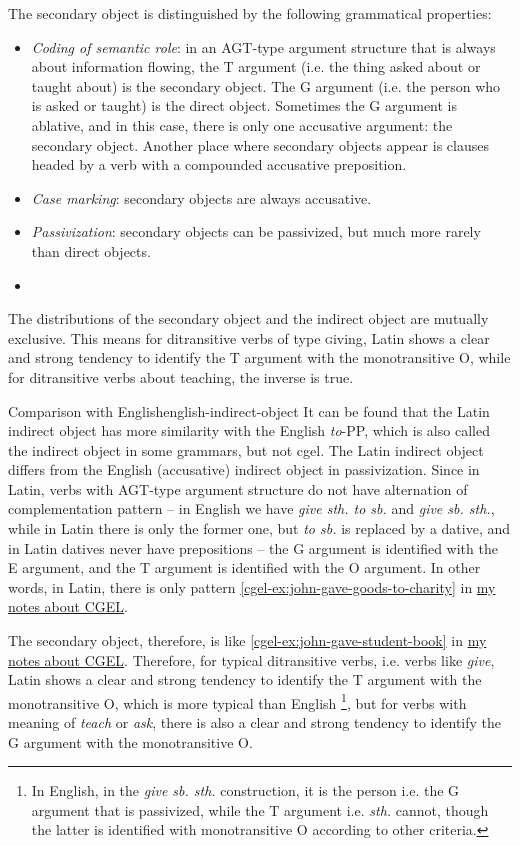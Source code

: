 \documentclass[UTF8, a4paper, oneside]{report}
\newcommand{\corpus}[1]{\emph{#1}}
\newcommand{\cgel}{\href{../English/cambridge.pdf}{my notes about CGEL}}
\newcommand{\classify}[1]{{\textsc #1}}
\begin{document}
The secondary object is distinguished by the following grammatical properties:
\begin{itemize}
    \item \emph{Coding of semantic role}: in an AGT-type argument structure
    that is always about information flowing,
    the T argument (i.e. the thing asked about or taught about) is the secondary object.
    The G argument (i.e. the person who is asked or taught) is the direct object.
    Sometimes the G argument is ablative, and in this case, 
    there is only one accusative argument: the secondary object.
    Another place where secondary objects appear is 
    clauses headed by a verb with a compounded accusative preposition. %
    \item \emph{Case marking}: secondary objects are always accusative.
    \item \emph{Passivization}: secondary objects can be passivized, but much more rarely than direct objects.
    \item %
\end{itemize}

The distributions of the secondary object and the indirect object 
are mutually exclusive.
This means for ditransitive verbs of type \classify{giving}, 
Latin shows a clear and strong tendency to identify the T argument with the monotransitive O,
while for ditransitive verbs about teaching,
the inverse is true.

\begin{infobox}{Comparison with English}{english-indirect-object}
    It can be found that the Latin indirect object has more similarity with the English \corpus{to}-PP,
    which is also called the indirect object in some grammars, but not \ac{cgel}.
    The Latin indirect object differs from the English (accusative) indirect object in passivization.
    Since in Latin, verbs with AGT-type argument structure do not have alternation of complementation pattern
    -- in English we have \corpus{give sth. to sb.} and \corpus{give sb. sth.}, 
    while in Latin there is only the former one, but \corpus{to sb.} is replaced by a dative,
    and in Latin datives never have prepositions --
    the G argument is identified with the E argument,
    and the T argument is identified with the O argument.
    In other words, in Latin, there is only pattern \eqref{cgel-ex:john-gave-goods-to-charity} in \cgel.
    
    The secondary object, therefore, is like \eqref{cgel-ex:john-gave-student-book} in \cgel.
    Therefore, for typical ditransitive verbs, i.e. verbs like \corpus{give}, 
    Latin shows a clear and strong tendency to identify the T argument with the monotransitive O,
    which is more typical than English%
    \footnote{
        In English, in the \corpus{give sb. sth.} construction, it is the person i.e. the G argument that is passivized,
        while the T argument i.e. \corpus{sth.} cannot, though the latter is identified with monotransitive O
        according to other criteria. 
    },
    but for verbs with meaning of \corpus{teach} or \corpus{ask},
    there is also a clear and strong tendency to identify the G argument with the monotransitive O.
\end{infobox}
\end{document}
